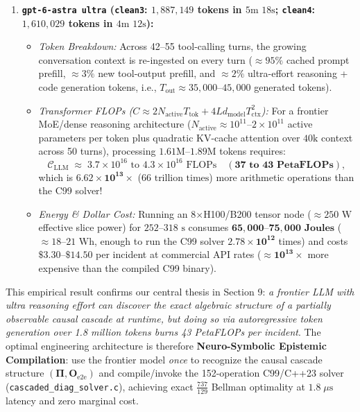 \documentclass[11pt,a4paper]{article}
\theoremstyle{definition}
\theoremstyle{remark}
\begin{document}
\begin{enumerate}[leftmargin=1.6em]
    \item \textbf{\texttt{gpt-6-astra ultra} (\texttt{clean3}: $1{,}887{,}149$ tokens in $5\text{m }18\text{s}$; \texttt{clean4}: $1{,}610{,}029$ tokens in $4\text{m }12\text{s}$):}
    \begin{itemize}
        \item \emph{Token Breakdown:} Across 42--55 tool-calling turns, the growing conversation context is re-ingested on every turn ($\approx 95\%$ cached prompt prefill, $\approx 3\%$ new tool-output prefill, and $\approx 2\%$ ultra-effort reasoning + code generation tokens, i.e., $T_{\text{out}} \approx 35{,}000\text{--}45{,}000$ generated tokens).
        \item \emph{Transformer FLOPs ($C \approx 2 N_{\text{active}} T_{\text{tok}} + 4 L d_{\text{model}} T_{\text{ctx}}^2$):} For a frontier MoE/dense reasoning architecture ($N_{\text{active}} \approx 10^{11}\text{--}2\times 10^{11}$ active parameters per token plus quadratic KV-cache attention over $40\text{k}$ context across 50 turns), processing $1.61\text{M}\text{--}1.89\text{M}$ tokens requires:
        \begin{equation}
            \mathcal{C}_{\text{LLM}} \;\approx\; 3.7 \times 10^{16}\text{ to } 4.3 \times 10^{16}\text{ FLOPs} \quad (\mathbf{37\text{ to }43\text{ PetaFLOPs}}),
        \end{equation}
        which is $\mathbf{6.62 \times 10^{13}\times}$ ($66\text{ trillion times}$) more arithmetic operations than the C99 solver!
        \item \emph{Energy \& Dollar Cost:} Running an 8$\times$H100/B200 tensor node ($\approx 250\text{ W}$ effective slice power) for $252\text{--}318\text{ s}$ consumes $\mathbf{65{,}000\text{--}75{,}000\text{ Joules}}$ ($\approx 18\text{--}21\text{ Wh}$, enough to run the C99 solver $\mathbf{2.78 \times 10^{12}}$ times) and costs $\mathbf{\$3.30\text{--}\$14.50}$ per incident at commercial API rates ($\approx \mathbf{10^{13}\times}$ more expensive than the compiled C99 binary).
    \end{itemize}
\end{enumerate}

This empirical result confirms our central thesis in Section 9: \emph{a frontier LLM with ultra reasoning effort can discover the exact algebraic structure of a partially observable causal cascade at runtime, but doing so via autoregressive token generation over 1.8 million tokens burns 43 PetaFLOPs per incident}. The optimal engineering architecture is therefore \textbf{Neuro-Symbolic Epistemic Compilation}: use the frontier model \emph{once} to recognize the causal cascade structure $(\bm{\Pi}, \bm{O}_{\text{e2e}})$ and compile/invoke the 152-operation C99/C++23 solver (\texttt{cascaded\_diag\_solver.c}), achieving exact $\frac{737}{129}$ Bellman optimality at $1.8\;\mu\text{s}$ latency and zero marginal cost.
\end{document}
